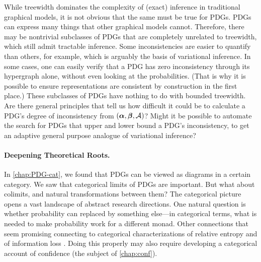 While treewidth dominates the complexity of (exact) inference in traditional graphical models, it is not obvious that the same must be true for PDGs. 
PDGs can express many things that other graphical models cannot. 
Therefore, there may be nontrivial subclasses of PDGs that are completely unrelated to treewidth, which still admit tractable inference. 
%
Some inconsistencies are easier to quantify than others, for example,
    which is arguably the basis of variational inference.
In some cases, one can easily verify that a PDG has zero inconsistency through its hypergraph alone, without even looking at the probabilities.
(That is why it is possible to ensure representations are consistent by construction in the first place.)
These subclasses of PDGs have nothing to do with bounded treewidth. 
Are there general principles that tell us how difficult it could be to calculate a PDG's degree of inconsistency from $(\boldsymbol\alpha,\boldsymbol\beta,\mathcal A)$?
Might it be possible to automate the 
    search for PDGs that upper and lower bound a PDG's inconsistency,
    to get an adaptive general purpose analogue of variational inference?
    
\paragraph{Deepening Theoretical Roots.}
% 
In \cref{chap:PDG-cat}, we found that PDGs can be viewed as diagrams in a certain category. 
We saw that categorical limits of PDGs are important. But what about colimits, and natural transformations between them? 
The categorical picture opens a vast landscape of abstract research directions.
One natural question is whether probability can replaced by something else---in categorical terms, what is needed to make probability work for a different monad.
%
Other connections that seem promising connecting to categorical characterizations of relative entropy \citep{baez2014bayesiancharacterizationrelativeentropy} 
and of information loss \citep[Theorem 12.4.9]{leinster2021entropy}.
Doing this properly may also require developing a categorical account of confidence (the subject of \cref{chap:conf}). 

